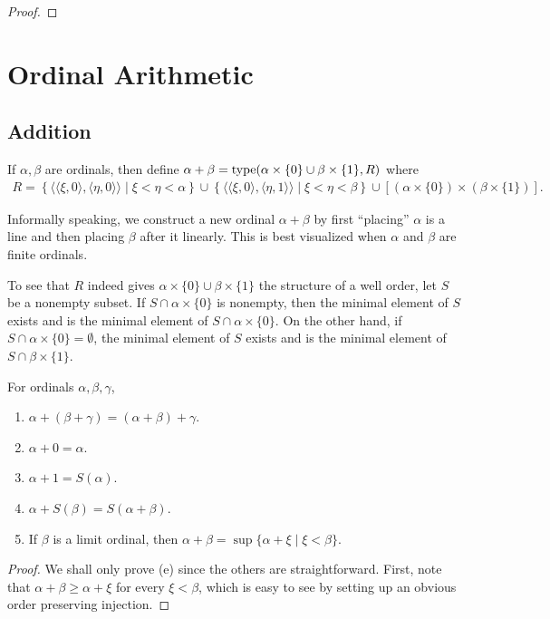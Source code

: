 \begin{proof}
    
\end{proof}

\section{Ordinal Arithmetic}
\subsection*{Addition}

\begin{definition}
    If $\alpha,\beta$ are ordinals, then define $\alpha + \beta = \operatorname{type}(\alpha\times\{0\}\cup\beta\times\{1\},R)$ where 
    \begin{align*}
        R = \left\{\langle\langle\xi,0\rangle,\langle\eta,0\rangle\rangle\mid \xi < \eta < \alpha\right\}\cup\left\{\langle\langle\xi,0\rangle,\langle\eta,1\rangle\rangle\mid\xi < \eta < \beta\right\}\cup\left[(\alpha\times\{0\})\times(\beta\times\{1\})\right].
    \end{align*}
\end{definition}

Informally speaking, we construct a new ordinal $\alpha + \beta$ by first ``placing'' $\alpha$ is a line and then placing $\beta$ after it linearly. This is best visualized when $\alpha$ and $\beta$ are finite ordinals.

To see that $R$ indeed gives $\alpha\times\{0\}\cup\beta\times\{1\}$ the structure of a well order, let $S$ be a nonempty subset. If $S\cap\alpha\times\{0\}$ is nonempty, then the minimal element of $S$ exists and is the minimal element of $S\cap\alpha\times\{0\}$. On the other hand, if $S\cap\alpha\times\{0\} = \emptyset$, the minimal element of $S$ exists and is the minimal element of $S\cap\beta\times\{1\}$. 

\begin{lemma}
    For ordinals $\alpha,\beta,\gamma$,
    \begin{enumerate}[label=(\alph*)]
        \item $\alpha + (\beta + \gamma) = (\alpha + \beta) + \gamma$.
        \item $\alpha + 0 = \alpha$.
        \item $\alpha + 1 = S(\alpha)$.
        \item $\alpha + S(\beta) = S(\alpha + \beta)$.
        \item If $\beta$ is a limit ordinal, then $\alpha + \beta = \sup\{\alpha + \xi\mid \xi < \beta\}$.
    \end{enumerate}
\end{lemma}
\begin{proof}
    We shall only prove (e) since the others are straightforward. First, note that $\alpha + \beta\ge\alpha + \xi$ for every $\xi < \beta$, which is easy to see by setting up an obvious order preserving injection.
\end{proof}

